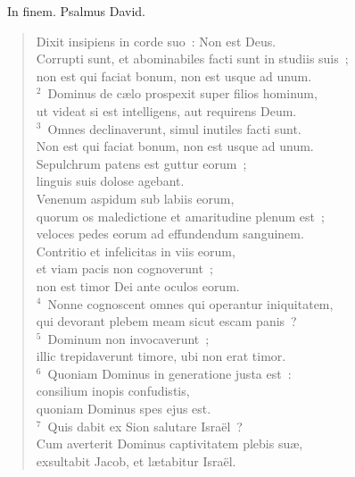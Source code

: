 ~\lettrine[lines=10,image=true,loversize=0.05,lraise=-0.03]{I}{}n finem. Psalmus David. \begin{flushleft}\begin{verse}\vspace{6pt}Dixit insipiens in corde suo~: Non est Deus.\\ Corrupti sunt, et abominabiles facti sunt in studiis suis~;\\ non est qui faciat bonum, non est usque ad unum.\\
${}^{2}$~Dominus de c\ae lo prospexit super filios hominum,\\ ut videat si est intelligens, aut requirens Deum.\\
${}^{3}$~Omnes declinaverunt, simul inutiles facti sunt.\\ Non est qui faciat bonum, non est usque ad unum.\\ Sepulchrum patens est guttur eorum~;\\ linguis suis dolose agebant.\\ Venenum aspidum sub labiis eorum,\\ quorum os maledictione et amaritudine plenum est~;\\ veloces pedes eorum ad effundendum sanguinem.\\ Contritio et infelicitas in viis eorum,\\ et viam pacis non cognoverunt~;\\ non est timor Dei ante oculos eorum.\\
${}^{4}$~Nonne cognoscent omnes qui operantur iniquitatem,\\ qui devorant plebem meam sicut escam panis~?\\
${}^{5}$~Dominum non invocaverunt~;\\ illic trepidaverunt timore, ubi non erat timor.\\
${}^{6}$~Quoniam Dominus in generatione justa est~:\\ consilium inopis confudistis,\\ quoniam Dominus spes ejus est.\\
${}^{7}$~Quis dabit ex Sion salutare Isra\"el~?\\ Cum averterit Dominus captivitatem plebis su\ae ,\\ exsultabit Jacob, et l\ae tabitur Isra\"el.\end{verse}\end{flushleft}


